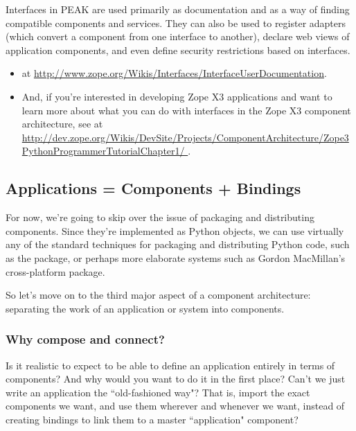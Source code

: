 Interfaces in PEAK are used primarily as documentation and as a way of finding
compatible components and services.  They can also be used to register adapters
(which convert a component from one interface to another), declare web views of
application components, and even define security restrictions based on
interfaces.

\vfill
\begin{seealso}\begin{itemize}

\item {} at
\url{http://www.zope.org/Wikis/Interfaces/InterfaceUserDocumentation}.

\item And, if you're interested in developing Zope X3 applications and want to
learn more about what you can do with interfaces in the Zope X3 component
architecture, see  at \url{http://dev.zope.org/Wikis/DevSite/Projects/ComponentArchitecture/Zope3PythonProgrammerTutorialChapter1/
}.

\end{itemize}\end{seealso}
\vfill



\subsection{Applications = Components + Bindings}

For now, we're going to skip over the issue of packaging and distributing
components.  Since they're implemented as Python objects, we can use virtually
any of the standard techniques for packaging and distributing Python code,
such as the  package, or perhaps more elaborate systems such
as Gordon MacMillan's cross-platform  package.

So let's move on to the third major aspect of a component architecture:
separating the work of an application or system into components.


\subsubsection{Why compose and connect?}

Is it realistic to expect to be able to define an application entirely in
terms of components?  And why would you want to do it in the first place?
Can't we just write an application the ``old-fashioned way"?  That is,
import the exact components we want, and use them wherever and whenever
we want, instead of creating bindings to link them to a master ``application"
component?


